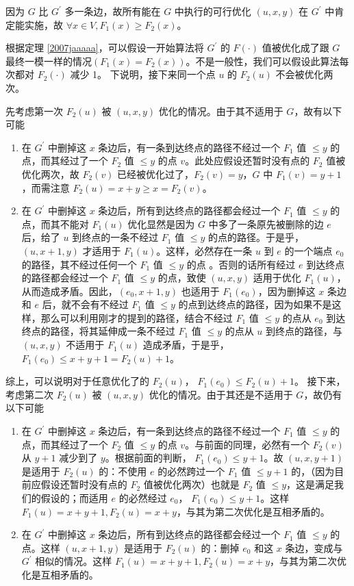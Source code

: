 				\begin{pf}
					因为 $G$ 比 $G^\prime$ 多一条边，故所有能在 $G$ 中执行的可行优化 $(u, x, y)$ 在 $G^\prime$ 中肯定能实施，故  $\forall x \in V, F_1(x)\ge F_2(x)  $。
					
					根据定理 \ref{2007jaaaaa}，可以假设一开始算法将 $G^\prime$ 的 $F(\cdot)$ 值被优化成了跟 $G$ 最终一模一样的情况$(F_1(x) = F_2(x))$。不是一般性，我们可以假设此算法每次都对 $F_2(\cdot)$ 减少 1。
					下说明，接下来同一个点 $u$ 的 $F_2(u)$ 不会被优化两次。
					
					先考虑第一次 $F_2(u)$ 被 $(u, x, y)$ 优化的情况。由于其不适用于 $G$，故有以下可能
						\begin{enumerate} 
							\item 在 $G^\prime$ 中删掉这 $x$ 条边后，有一条到达终点的路径不经过一个 $F_1$ 值 $\le y$ 的点，而其经过了一个 $F_2$ 值 $\le y$ 的点 $v$。此处应假设还暂时没有点的 $F_2$ 值被优化两次，故 $F_2(v)$ 已经被优化过了，$F_2(v) = y$，$G$ 中 $F_1(v) = y + 1$，而需注意 $F_2(u) = x + y \ge x = F_2(v) $。
							\item  在  $G^\prime$ 中删掉这 $x$ 条边后，所有到达终点的路径都会经过一个 $F_1$ 值 $\le y$ 的点，而其不能对 $F_1(u)$ 优化显然是因为 $G$ 中多了一条原先被删除的边 $e$ 后，给了 $u$ 到终点的一条不经过  $F_1$ 值 $\le y$  的点的路径。于是乎， $(u, x + 1, y)$ 才适用于 $F_1(u)$。这样，必然存在一条 $u$ 到 $e$ 的一个端点 $e_0$ 的路径，其不经过任何一个  $F_1$ 值 $\le y$ 的点 。否则的话所有经过  $e$ 到达终点的路径都会经过一个 $F_1$ 值 $\le y$ 的点，致使 $(u, x, y)$ 适用于优化 $F_1(u)$，从而造成矛盾。因此，$(e_0, x + 1, y)$ 也适用于 $F_1(e_0)$，因为删掉这 $x$ 条边和 $e$ 后，就不会有不经过 $F_1$ 值 $\le y$ 的点到达终点的路径，因为如果不是这样，那么可以利用刚才的提到的路径，结合不经过 $F_1$ 值 $\le y$ 的点从 $e_0$ 到达终点的路径，将其延伸成一条不经过 $F_1$ 值 $\le y$ 的点从 $u$ 到终点的路径，与 $(u, x, y)$ 不适用于 $F_1(u)$ 造成矛盾，于是乎，$F_1(e_0) \le x + y + 1 = F_2(u) + 1$。
						\end{enumerate}
						
						综上，可以说明对于任意优化了的  $F_2(u)$， $F_1(e_0) \le F_2(u) + 1$。
						接下来，考虑第二次 $F_2(u)$ 被 $(u, x, y)$ 优化的情况。由于其还是不适用于 $G$，故仍有以下可能
						\begin{enumerate} 
							\item 在 $G^\prime$ 中删掉这 $x$ 条边后，有一条到达终点的路径不经过一个 $F_1$ 值 $\le y$ 的点，而其经过了一个 $F_2$ 值 $\le y$ 的点 $v$。与前面的同理，必然有一个 $F_2(v)$ 从 $y + 1$ 减少到了 $y$。根据前面的判断， $F_1(e_0) \le y + 1$。故  $(u, x, y + 1)$ 是适用于 $F_2(u)$ 的：不使用 $e$ 的必然跨过一个 $F_1$ 值 $\le y + 1$ 的，（因为目前应假设还暂时没有点的 $F_2$ 值被优化两次）也就是 $F_2$ 值 $\le y$，这是满足我们的假设的；而适用 $e$ 的必然经过 $e_0$， $F_1(e_0) \le y + 1$。这样 $F_1(u) = x + y + 1, F_2(u) = x + y$，与其为第二次优化是互相矛盾的。
							\item 在  $G^\prime$ 中删掉这 $x$ 条边后，所有到达终点的路径都会经过一个 $F_1$ 值 $\le y$ 的点。这样  $(u, x + 1, y)$ 是适用于 $F_2(u)$ 的：删掉 $e_0$ 和这 $x$ 条边，变成与 $G^\prime$ 相似的情况。这样 $F_1(u) = x + y + 1, F_2(u) = x + y$，与其为第二次优化是互相矛盾的。
						\end{enumerate}
					

\end{pf}
